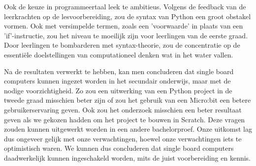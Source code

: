 Ook de keuze in programmeertaal leek te ambitieus. Volgens de feedback van de leerkrachten op de lesvoorbereiding, zou de syntax van Python een groot obstakel vormen. Ook met versimpelde termen, zoals een 'voorwaarde' in plaats van een 'if'-instructie, zou het niveau te moeilijk zijn voor leerlingen van de eerste graad. Door leerlingen te bombarderen met syntax-theorie, zou de concentratie op de essentiële doelstellingen van computationeel denken wat in het water vallen.

Na de resultaten verwerkt te hebben, kan men concluderen dat single board computers kunnen ingezet worden in het secundair onderwijs, maar met de nodige voorzichtigheid. Zo zou een uitwerking van een Python project in de tweede graad misschien beter zijn of zou het gebruik van een Micro:bit een betere gebruikerservaring geven. Ook zou het onderzoek misschien een beter resultaat geven als we gekozen hadden om het project te bouwen in Scratch. Deze vragen zouden kunnen uitgewerkt worden in een andere bachelorproef. Onze uitkomst lag dus ongeveer gelijk met onze verwachtingen, hoewel onze verwachtingen iets te optimistisch waren. We kunnen dus concluderen dat single board computers daadwerkelijk kunnen ingeschakeld worden, mits de juist voorbereiding en kennis.

